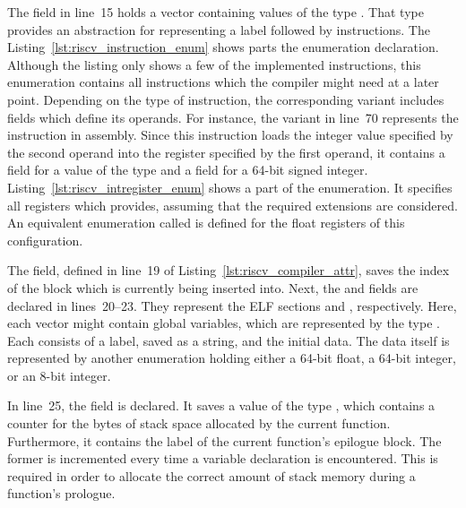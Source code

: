 
The  field in line~15 holds a vector containing values of the type .
That type provides an abstraction for representing a label followed by instructions.
The Listing~\ref{lst:riscv_instruction_enum} shows parts the  enumeration declaration.
Although the listing only shows a few of the implemented instructions,
this enumeration contains all instructions which the compiler might need at a later point.
Depending on the type of instruction, the corresponding variant includes fields which define its operands.
For instance, the  variant in line~70 represents the  instruction in assembly.
Since this instruction loads the integer value specified by the second operand into the register specified by the first operand,
it contains a field for a value of the type  and a field for a 64-bit signed integer.
Listing~\ref{lst:riscv_intregister_enum} shows a part of the  enumeration.
It specifies all registers which \riscv{} provides, assuming that the required extensions are considered.
An equivalent enumeration called  is defined for the float registers of this \riscv{} configuration.


The  field, defined in line~19 of Listing~\ref{lst:riscv_compiler_attr},
saves the index of the block which is currently being inserted into.
Next, the  and  fields are declared in lines~20--23.
They represent the ELF sections  and , respectively.
Here, each vector might contain global variables, which are represented by the type .
Each  consists of a label, saved as a string, and the initial data.
The data itself is represented by another enumeration holding either a 64-bit float, a 64-bit integer, or an 8-bit integer.

In line~25, the  field is declared.
It saves a value of the type , which contains a counter for the bytes of stack space allocated by the current function.
Furthermore, it contains the label of the current function's epilogue block.
The former is incremented every time a variable declaration is encountered.
This is required in order to allocate the correct amount of stack memory during a function's prologue.


